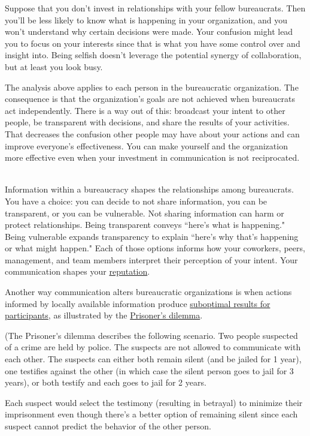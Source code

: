 Suppose that you don't invest in relationships with your fellow bureaucrats. Then you'll be less likely to know what is happening in your organization, and you won't understand why certain decisions were made. Your confusion might lead you to focus on your interests since that is what you have some control over and insight into. Being selfish doesn't leverage the potential synergy of collaboration, but at least you look busy. 

The analysis above applies to each person in the bureaucratic organization.
The consequence is that the organization's goals are not achieved when bureaucrats act independently. 
There is a way out of this: broadcast your intent to other people, be transparent with decisions, and share the results of your activities. That decreases the confusion other people may have about your actions and can improve everyone's effectiveness. You can make yourself and the organization more effective even when your investment in communication is not reciprocated.

\ \\

Information within a bureaucracy shapes the relationships among bureaucrats. You have a choice: you can decide to not share information, you can be transparent, or you can be vulnerable.  
Not sharing information can harm or protect relationships. 
Being transparent conveys ``here's what is happening." Being vulnerable expands transparency to explain ``here's why that's happening or what might happen."
Each of those options informs how your coworkers, peers, management, and team members interpret their perception of your intent. Your communication shapes your \hyperref[sec:reputation]{reputation}.


Another way communication alters bureaucratic organizations is when actions informed by locally available information produce \hyperref[sec:failure-to-comm]{suboptimal results for participants}, 
%
as illustrated by the
\href{https://en.wikipedia.org/wiki/Prisoner\%27s\_dilemma}{Prisoner's dilemma}. 

\begin{mdframed}[frametitle={Prisoner's Dilemma},frametitlerule=true,frametitlealignment=\centering]
(The \gls{Prisoner's dilemma} describes the following scenario. Two people suspected of a crime are held by police. The suspects are not allowed to communicate with each other. The suspects can either both remain silent (and be jailed for 1 year), one testifies against the other (in which case the silent person goes to jail for 3 years), or both testify and each goes to jail for 2 years.

Each suspect would select the testimony (resulting in betrayal) to minimize their imprisonment even though there's a better option of remaining silent since each suspect cannot predict the behavior of the other person. 
\label{prisoners_dilemma_explanation}
\end{mdframed}


